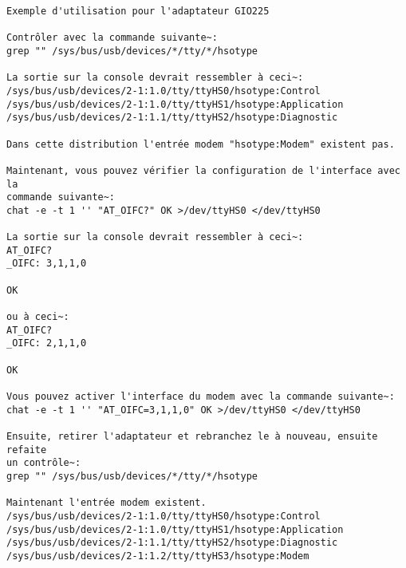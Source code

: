 \begin{verbatim}
Exemple d'utilisation pour l'adaptateur GIO225

Contrôler avec la commande suivante~:
grep "" /sys/bus/usb/devices/*/tty/*/hsotype

La sortie sur la console devrait ressembler à ceci~:
/sys/bus/usb/devices/2-1:1.0/tty/ttyHS0/hsotype:Control
/sys/bus/usb/devices/2-1:1.0/tty/ttyHS1/hsotype:Application
/sys/bus/usb/devices/2-1:1.1/tty/ttyHS2/hsotype:Diagnostic

Dans cette distribution l'entrée modem "hsotype:Modem" existent pas.

Maintenant, vous pouvez vérifier la configuration de l'interface avec la
commande suivante~:
chat -e -t 1 '' "AT_OIFC?" OK >/dev/ttyHS0 </dev/ttyHS0

La sortie sur la console devrait ressembler à ceci~:
AT_OIFC?
_OIFC: 3,1,1,0

OK

ou à ceci~:
AT_OIFC?
_OIFC: 2,1,1,0

OK

Vous pouvez activer l'interface du modem avec la commande suivante~:
chat -e -t 1 '' "AT_OIFC=3,1,1,0" OK >/dev/ttyHS0 </dev/ttyHS0

Ensuite, retirer l'adaptateur et rebranchez le à nouveau, ensuite refaite
un contrôle~:
grep "" /sys/bus/usb/devices/*/tty/*/hsotype

Maintenant l'entrée modem existent.
/sys/bus/usb/devices/2-1:1.0/tty/ttyHS0/hsotype:Control
/sys/bus/usb/devices/2-1:1.0/tty/ttyHS1/hsotype:Application
/sys/bus/usb/devices/2-1:1.1/tty/ttyHS2/hsotype:Diagnostic
/sys/bus/usb/devices/2-1:1.2/tty/ttyHS3/hsotype:Modem
\end{verbatim}

